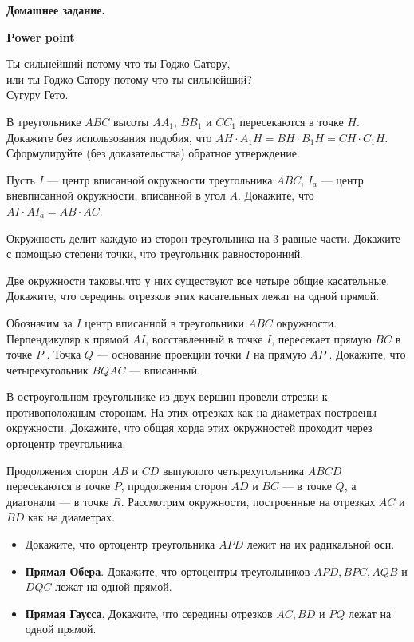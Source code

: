 \centerline{\bf \Huge Домашнее задание.}
\centerline{\bf \Huge Power point}

\begin{flushright}
        \scriptsize{Ты сильнейший потому что ты Годжо Сатору,\\или ты Годжо Сатору потому что ты сильнейший?\\Сугуру Гето.}
\end{flushright}

В треугольнике $ABC$ высоты $AA_1$, $BB_1$ и $CC_1$ пересекаются в точке $H$. Докажите без использования подобия, что $AH\cdot A_1H = BH \cdot B_1H= CH  \cdot C_1H$. Сформулируйте (без доказательства) обратное утверждение.

Пусть $I$ --- центр вписанной окружности треугольника $ABC$, $I_a$ --- центр вневписанной окружности, вписанной в угол $A$. Докажите, что $AI \cdot AI_a = AB \cdot AC.$

Окружность делит каждую из сторон треугольника на $3$ равные части. Докажите с помощью степени точки, что треугольник равносторонний.

Две окружности таковы,что у них существуют все четыре общие касательные. Докажите, что середины отрезков этих касательных лежат на одной прямой.


Обозначим за $I$ центр вписанной в треугольники $ABC$ окружности. Перпендикуляр к прямой $AI$, восставленный в точке $I$, пересекает прямую $BC$ в точке $P$ . Точка $Q$ --- основание проекции точки $I$ на прямую $AP$ . Докажите, что четырехугольник $BQAC$ --- вписанный.

В остроугольном треугольнике из двух вершин провели отрезки к противоположным сторонам. На этих отрезках как на диаметрах построены окружности. Докажите, что общая хорда этих окружностей проходит через ортоцентр треугольника.

Продолжения сторон $AB$ и $CD$ выпуклого четырехугольника $ABCD$ пересекаются в точке $P$, продолжения сторон $AD$ и $BC$ --- в точке $Q$, а диагонали --- в точке $R$. Рассмотрим окружности, построенные на отрезках $AC$ и $BD$ как на диаметрах. 
\begin{itemize}
    \item[a)] Докажите, что ортоцентр треугольника $APD$ лежит на их радикальной оси.
    \item[b)] \textbf{Прямая Обера}. Докажите, что ортоцентры треугольников $APD, BPC, AQB$ и $DQC$ лежат на одной прямой.
    \item[c)] \textbf{Прямая Гаусса}. Докажите, что середины отрезков $AC, BD$ и $PQ$ лежат на одной прямой.

\end{itemize}